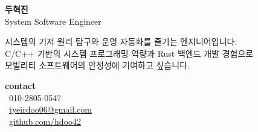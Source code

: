 \documentclass[10pt, a4paper]{article}
\begin{document}
\pagestyle{empty}

\noindent
\begin{minipage}[t]{0.70\textwidth} %
    {\huge\bfseries 두혁진}  \\[0.6em]
    {\Large\textcolor{bonusSteelBlue}{System Software Engineer}} 
    \vspace{0.8em}
    
    {\small 
    시스템의 기저 원리 탐구와 운영 자동화를 즐기는 엔지니어입니다. \\
    C/C++ 기반의 시스템 프로그래밍 역량과 Rust 백엔드 개발 경험으로 \\
    모빌리티 소프트웨어의 안정성에 기여하고 싶습니다.}
\end{minipage}%
\hfill
\begin{minipage}[t]{0.28\textwidth} %
    {\huge\bfseries contact} \\
    {\small
    \faPhone \ 010-2805-0547 \\
    \faEnvelope \ \href{mailto:tyeirdoo06@gmail.com}{tyeirdoo06@gmail.com} \\
    \faGithub \ \href{https://github.com/hdoo42}{github.com/hdoo42}
    }
\end{minipage}

\vspace{1.0em}
\end{document}
